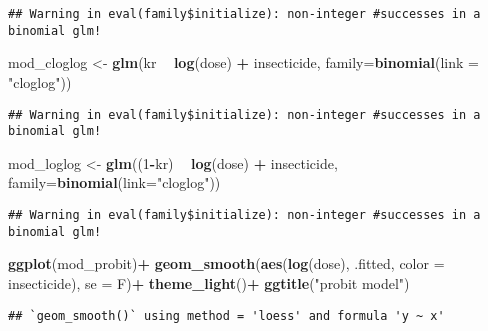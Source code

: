 \documentclass[
]{article}
\newenvironment{Shaded}{\begin{snugshade}}{\end{snugshade}}
\newcommand{\DataTypeTok}[1]{\textcolor[rgb]{0.13,0.29,0.53}{#1}}
\newcommand{\DecValTok}[1]{\textcolor[rgb]{0.00,0.00,0.81}{#1}}
\newcommand{\KeywordTok}[1]{\textcolor[rgb]{0.13,0.29,0.53}{\textbf{#1}}}
\newcommand{\NormalTok}[1]{#1}
\newcommand{\OperatorTok}[1]{\textcolor[rgb]{0.81,0.36,0.00}{\textbf{#1}}}
\newcommand{\StringTok}[1]{\textcolor[rgb]{0.31,0.60,0.02}{#1}}
\begin{document}
\begin{verbatim}
## Warning in eval(family$initialize): non-integer #successes in a binomial glm!
\end{verbatim}

\begin{Shaded}
\begin{Highlighting}[]
\NormalTok{mod_cloglog <-}\StringTok{ }\KeywordTok{glm}\NormalTok{(kr }\OperatorTok{~}\StringTok{ }\KeywordTok{log}\NormalTok{(dose) }\OperatorTok{+}\StringTok{ }\NormalTok{insecticide, }\DataTypeTok{family=}\KeywordTok{binomial}\NormalTok{(}\DataTypeTok{link =} \StringTok{"cloglog"}\NormalTok{))}
\end{Highlighting}
\end{Shaded}

\begin{verbatim}
## Warning in eval(family$initialize): non-integer #successes in a binomial glm!
\end{verbatim}

\begin{Shaded}
\begin{Highlighting}[]
\NormalTok{mod_loglog <-}\StringTok{ }\KeywordTok{glm}\NormalTok{((}\DecValTok{1}\OperatorTok{-}\NormalTok{kr) }\OperatorTok{~}\StringTok{ }\KeywordTok{log}\NormalTok{(dose) }\OperatorTok{+}\StringTok{ }\NormalTok{insecticide, }\DataTypeTok{family=}\KeywordTok{binomial}\NormalTok{(}\DataTypeTok{link=}\StringTok{"cloglog"}\NormalTok{))}
\end{Highlighting}
\end{Shaded}

\begin{verbatim}
## Warning in eval(family$initialize): non-integer #successes in a binomial glm!
\end{verbatim}

\begin{Shaded}
\begin{Highlighting}[]
\KeywordTok{ggplot}\NormalTok{(mod_probit)}\OperatorTok{+}
\StringTok{  }\KeywordTok{geom_smooth}\NormalTok{(}\KeywordTok{aes}\NormalTok{(}\KeywordTok{log}\NormalTok{(dose), .fitted, }\DataTypeTok{color =}\NormalTok{ insecticide), }\DataTypeTok{se =}\NormalTok{ F)}\OperatorTok{+}
\StringTok{  }\KeywordTok{theme_light}\NormalTok{()}\OperatorTok{+}
\StringTok{  }\KeywordTok{ggtitle}\NormalTok{(}\StringTok{"probit model"}\NormalTok{)}
\end{Highlighting}
\end{Shaded}

\begin{verbatim}
## `geom_smooth()` using method = 'loess' and formula 'y ~ x'
\end{verbatim}
\end{document}

